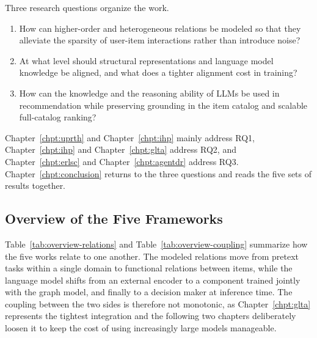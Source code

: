 Three research questions organize the work.

\begin{enumerate}[label=\textbf{RQ\arabic*.}, leftmargin=*, itemsep=0.2em, topsep=0.4em]
\item How can higher-order and heterogeneous relations be modeled so that they alleviate the sparsity of user-item interactions rather than introduce noise?
\item At what level should structural representations and language model knowledge be aligned, and what does a tighter alignment cost in training?
\item How can the knowledge and the reasoning ability of LLMs be used in recommendation while preserving grounding in the item catalog and scalable full-catalog ranking?
\end{enumerate}

Chapter~\ref{chpt:uprth} and Chapter~\ref{chpt:ihp} mainly address RQ1, Chapter~\ref{chpt:ihp} and Chapter~\ref{chpt:glta} address RQ2, and Chapter~\ref{chpt:erlsc} and Chapter~\ref{chpt:agentdr} address RQ3. Chapter~\ref{chpt:conclusion} returns to the three questions and reads the five sets of results together.

\subsection{Overview of the Five Frameworks}

Table~\ref{tab:overview-relations} and Table~\ref{tab:overview-coupling} summarize how the five works relate to one another. The modeled relations move from pretext tasks within a single domain to functional relations between items, while the language model shifts from an external encoder to a component trained jointly with the graph model, and finally to a decision maker at inference time. The coupling between the two sides is therefore not monotonic, as Chapter~\ref{chpt:glta} represents the tightest integration and the following two chapters deliberately loosen it to keep the cost of using increasingly large models manageable.

